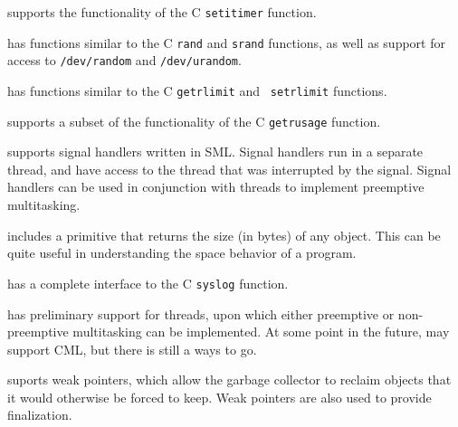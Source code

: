 \begin{description}
\begin{description}
{\mlton} supports the functionality of the C {\tt setitimer} function.

{\mlton} has functions similar to the C {\tt rand} and {\tt srand} functions, as
well as support for access to {\tt /dev/random} and {\tt /dev/urandom}.

{\mlton} has functions similar to the C {\tt getrlimit} and {\tt
setrlimit} functions.

{\mlton} supports a subset of the functionality of the C {\tt getrusage}
function.

{\mlton} supports signal handlers written in SML.  Signal handlers run
in a separate thread, and have access to the thread that was
interrupted by the signal.  Signal handlers can be used in conjunction
with threads to implement preemptive multitasking.

{\mlton} includes a primitive that returns the size (in bytes) of any
object.  This can be quite useful in understanding the space behavior
of a program.

{\mlton} has a complete interface to the C {\tt syslog} function.

{\mlton} has preliminary support for threads, upon which either
preemptive or non-preemptive multitasking can be implemented.  At some
point in the future, {\mlton} may support CML, but there is still a
ways to go.

{\mlton} suports weak pointers, which allow the garbage collector to
reclaim objects that it would otherwise be forced to keep.  Weak
pointers are also used to provide finalization.

\end{description}
\end{description}

